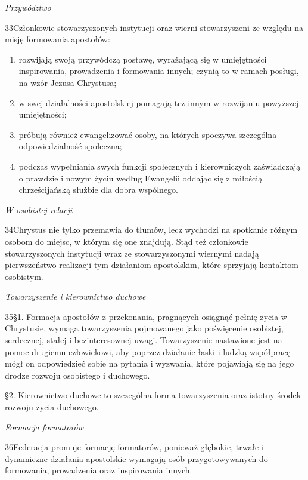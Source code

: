 ﻿\documentclass{book}
\newcommand{\lett}[1]{\lettrine[findent=6pt]{#1}}
\newcommand{\ssec}[1]{\vspace{1em}\textit{#1}\vspace{.5em}\nopagebreak}
\begin{document}
\ssec{Przywództwo}


\lett{33} Członkowie stowarzyszonych instytucji oraz wierni stowarzyszeni ze względu na misję formowania apostołów:


\begin{enumerate}


\item rozwijają swoją przywódczą postawę, wyrażającą się w umiejętności inspirowania, prowadzenia i formowania innych; czynią to w ramach posługi, na wzór Jezusa Chrystusa;


\item w swej działalności apostolskiej pomagają też innym w rozwijaniu powyższej umiejętności;


\item próbują również ewangelizować osoby, na których spoczywa szczególna odpowiedzialność społeczna;


\item podczas wypełniania swych funkcji społecznych i kierowniczych zaświadczają o prawdzie i nowym życiu według Ewangelii oddając się z miłością chrześcijańską służbie dla dobra wspólnego. 


\end{enumerate}
 
\ssec{W osobistej relacji}
 
\lett{34} Chrystus nie tylko przemawia do tłumów, lecz wychodzi na spotkanie różnym osobom do miejsc, w którym się one znajdują. Stąd też członkowie stowarzyszonych instytucji wraz ze stowarzyszonymi wiernymi nadają pierwszeństwo realizacji tym działaniom  apostolskim, które sprzyjają kontaktom osobistym.


 \ssec{Towarzyszenie i kierownictwo duchowe}


\lett{35} \S{}1. Formacja apostołów z przekonania, pragnących osiągnąć pełnię życia w Chrystusie, wymaga towarzyszenia pojmowanego jako poświęcenie osobistej, serdecznej, stałej i bezinteresownej uwagi. Towarzyszenie nastawione jest na pomoc drugiemu człowiekowi, aby poprzez działanie łaski i ludzką współpracę mógł on odpowiedzieć sobie na pytania i wyzwania, które pojawiają się na jego drodze rozwoju osobistego i duchowego.


\S{}2. Kierownictwo duchowe to szczególna forma towarzyszenia oraz istotny środek rozwoju życia duchowego.
 
\ssec{Formacja formatorów}
 
\lett{36} Federacja promuje formację formatorów, ponieważ głębokie, trwałe i dynamiczne działania apostolskie wymagają osób przygotowywanych do formowania, prowadzenia oraz inspirowania innych.
 
\end{document}
